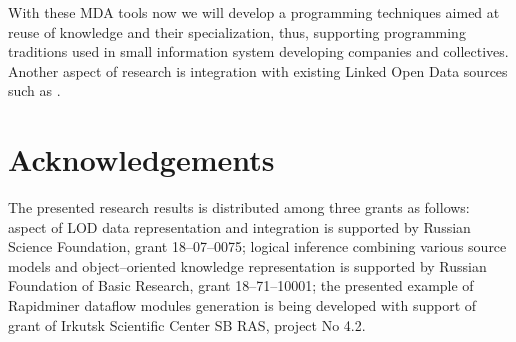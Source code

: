\documentclass[conference]{IEEEtran} \IEEEoverridecommandlockouts
\begin{document}
With these MDA tools now we will develop a programming techniques aimed at reuse of knowledge and their specialization, thus, supporting programming traditions used in small information system developing companies and collectives. Another aspect of research is integration with existing Linked Open Data sources such as \cite{digarch}. 

\section{Acknowledgements} \label{sec:ack-descr} 

The presented research results is distributed among three grants as follows: aspect of LOD data representation and integration is supported by Russian Science Foundation, grant 18--07--0075; logical inference combining various source models and object--oriented knowledge representation is supported by Russian Foundation of Basic Research, grant 18--71--10001; the presented example of Rapidminer dataflow modules generation is being developed with support of grant of Irkutsk Scientific Center SB RAS, project No 4.2. 
\end{document}

